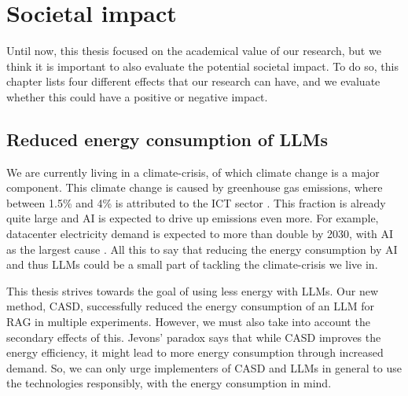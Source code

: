 
\chapter{Societal impact}
\label{sec:societal_impact}

Until now, this thesis focused on the academical value of our research, but we think it is important to also evaluate the potential societal impact. To do so, this chapter lists four different effects that our research can have, and we evaluate whether this could have a positive or negative impact.

\section{Reduced energy consumption of LLMs}
We are currently living in a climate-crisis, of which climate change is a major component. This climate change is caused by greenhouse gas emissions, where between 1.5\% and 4\% is attributed to the ICT sector \cite{ayers2025measuring}. This fraction is already quite large and AI is expected to drive  up emissions even more. For example, datacenter electricity demand is expected to more than double by 2030, with AI as the largest cause \cite{iea2025ai}. All this to say that reducing the energy consumption by AI and thus LLMs could be a small part of tackling the climate-crisis we live in.

This thesis strives towards the goal of using less energy with LLMs. Our new method, CASD, successfully reduced the energy consumption of an LLM for RAG in multiple experiments. However, we must also take into account the secondary effects of this. Jevons' paradox \cite{alcott2005jevons} says that while CASD improves the energy efficiency, it might lead to more energy consumption through increased demand. So, we can only urge implementers of CASD and LLMs in general to use the technologies responsibly, with the energy consumption in mind.

